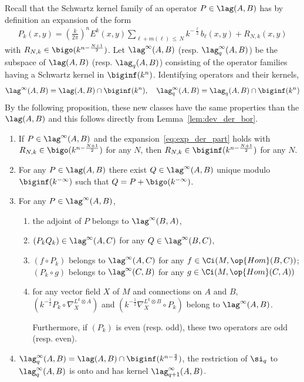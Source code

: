 Recall that the Schwartz kernel family of an operator $P \in \lag (A,B)$ has by definition an expansion of the form
\begin{gather}\label{eq:exp_der_part}
P_k (x,y) = \left(\frac{k}{2\pi} \right)^n E^k(x,y) \sum_{ \ell + m (\ell)\,\leqslant\,N} k^{- \frac{\ell}{2}} b_{\ell} (x,y) + R_{N,k} (x,y)
\end{gather}
with $R_{N,k} \in \bigo (k^{n- \frac{N+1}{2}})$.  Let $\lag^{\infty} (A,B)$ (resp. $\lag_q^{\infty} (A,B)$) be the subspace of $\lag (A,B)$ (resp. $\lag_q (A,B)$) consisting of the operator families having a Schwartz kernel in $\biginf (k^n)$.  Identifying operators and their kernels,
\[
\lag^{\infty} (A,B) = \lag (A,B) \cap \biginf (k^n), \quad \lag_q^{\infty} (A,B) = \lag_q (A,B) \cap \biginf (k^n)
\]
By the following proposition, these new classes have the same properties than the $\lag (A,B)$ and this follows directly from Lemma~\ref{lem:dev_der_bor}.

\begin{prop}\label{prop:versionlinfty}\leavevmode
\begin{enumerate}
\item \label{item:1}
If $P \in
\lag^{\infty} (A,B)$ and the expansion~\eqref{eq:exp_der_part} holds with $R_{N,k} \in \bigo (k^{n- \frac{N+1}{2}})$ for any $N$, then $R_{N,k} \in\biginf (k^{n- \frac{N+1}{2}})$ for any $N$.
\item \label{item:2}
For any $P \in \lag (A,B)$ there exist $Q \in
\lag^{\infty} (A,B)$ unique modulo $\biginf (k^{-\infty})$ such that $Q = P +\bigo (k^{-\infty})$.
\item \label{item:3}
 For any $ P \in \lag^{\infty}(A,B)$,
\begin{enumerate}
\item \label{item:a}
the adjoint of $P$ belongs to $\lag^{\infty} (B,A)$,
\item \label{item:b}
$(P_kQ_k) \in \lag ^{\infty} (A,C)$ for any $Q \in \lag ^{\infty} (B,C)$,
\item \label{item:c}
$(f \circ P_k)$ belongs to $\lag^{\infty} (A,C)$ for any $f \in \Ci (M,
\op{Hom} (B,C))$; $(P_k \circ g) $ belongs to $\lag ^{\infty} (C,B)$ for any $g \in \Ci (M, \op{Hom} (C,A))$
\item \label{item:d}
for any vector field $X$ of $M$ and connections on $A$ and $B$, $(k^{-\frac{1}{2}} P_k \circ \nabla^{L^k \otimes A}_X) $ and $(k^{-\frac{1}{2}} \nabla^{L^k \otimes B}_X \circ P_k)$ belong to $\lag^{\infty} (A,B)$.

Furthermore, if $(P_k)$ is even (resp. odd), these two operators are odd (resp. even).
\end{enumerate}

\item \label{item:4}
$\lag_q^{\infty} (A,B) = \lag (A,B) \cap \biginf (k^{n -
\frac{q}{2}})$, the restriction of $\si_q$ to $\lag_q^{\infty} (A,B)$ is onto and has kernel $\lag_{q+1} ^{\infty} (A,B)$.
\end{enumerate}
\end{prop}

